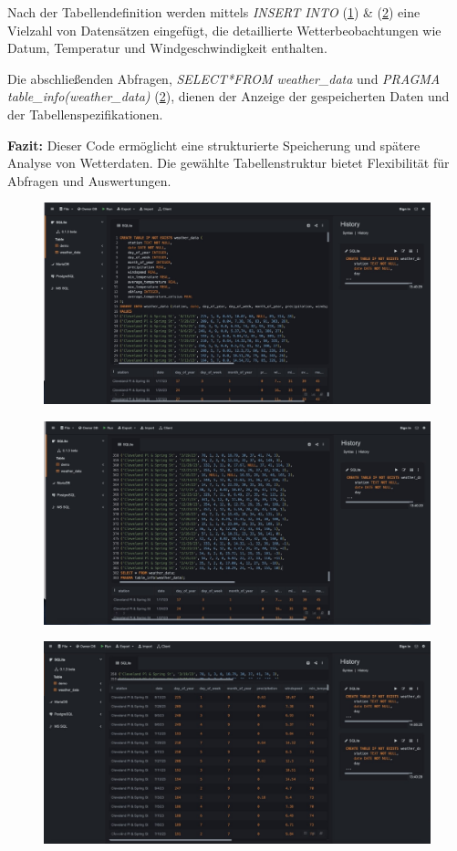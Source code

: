\documentclass{article}
\begin{document}
Nach der Tabellendefinition werden mittels \textit{INSERT INTO} (\ref{Abb1}) \& (\ref{Abb2}) eine Vielzahl von Datensätzen eingefügt, die detaillierte Wetterbeobachtungen wie Datum, Temperatur und Windgeschwindigkeit enthalten.

Die abschließenden Abfragen, \textit{SELECT*FROM weather\_data} und \textit{PRAGMA  table\_info(weather\_data)} (\ref{Abb2}), dienen der Anzeige der gespeicherten Daten und der Tabellenspezifikationen.

\textbf{Fazit:} Dieser Code ermöglicht eine strukturierte Speicherung und spätere Analyse von Wetterdaten. Die gewählte Tabellenstruktur bietet Flexibilität für Abfragen und Auswertungen. 



\begin{figure}[p]
    \centering
    \includegraphics[width=0.5\linewidth]{Bild1.jpeg}
    \caption{}
    \label{Abb1}
\end{figure}

\begin{figure}
    \centering
    \includegraphics[width=0.5\linewidth]{Bild2.jpeg}
    \caption{}
    \label{Abb2}
\end{figure}

\begin{figure}
    \centering
    \includegraphics[width=0.5\linewidth]{Bild3.jpeg}
    \caption{}
    \label{Abb3}
\end{figure}
\end{document}
